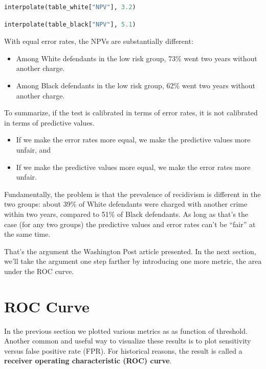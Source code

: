 \begin{lstlisting}[language=Python,style=source]
interpolate(table_white["NPV"], 3.2)
\end{lstlisting}

\begin{lstlisting}[language=Python,style=source]
interpolate(table_black["NPV"], 5.1)
\end{lstlisting}

With equal error rates, the NPVs are substantially different:

\begin{itemize}
\item
  Among White defendants in the low risk group, 73\% went two years
  without another charge.
\item
  Among Black defendants in the low risk group, 62\% went two years
  without another charge.
\end{itemize}

To summarize, if the test is calibrated in terms of error rates, it is
not calibrated in terms of predictive values.

\begin{itemize}
\item
  If we make the error rates more equal, we make the predictive values
  more unfair, and
\item
  If we make the predictive values more equal, we make the error rates
  more unfair.
\end{itemize}

Fundamentally, the problem is that the prevalence of recidivism is
different in the two groups: about 39\% of White defendants were charged
with another crime within two years, compared to 51\% of Black
defendants. As long as that's the case (for any two groups) the
predictive values and error rates can't be ``fair'' at the same time.

That's the argument the Washington Post article presented. In the next
section, we'll take the argument one step farther by introducing one
more metric, the area under the ROC curve.

\hypertarget{roc-curve}{%
\section{ROC Curve}\label{roc-curve}}

In the previous section we plotted various metrics as as function of
threshold. Another common and useful way to visualize these results is
to plot sensitivity versus false positive rate (FPR). For historical
reasons, the result is called a \textbf{receiver operating
characteristic (ROC) curve}.

